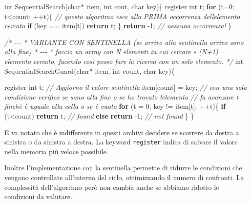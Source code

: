 \documentclass[
]{article}
\newenvironment{Shaded}{}{}
\newcommand{\AttributeTok}[1]{\textcolor[rgb]{0.49,0.56,0.16}{#1}}
\newcommand{\CommentTok}[1]{\textcolor[rgb]{0.38,0.63,0.69}{\textit{#1}}}
\newcommand{\ControlFlowTok}[1]{\textcolor[rgb]{0.00,0.44,0.13}{\textbf{#1}}}
\newcommand{\DataTypeTok}[1]{\textcolor[rgb]{0.56,0.13,0.00}{#1}}
\newcommand{\DecValTok}[1]{\textcolor[rgb]{0.25,0.63,0.44}{#1}}
\newcommand{\NormalTok}[1]{#1}
\begin{document}
\begin{Shaded}
\begin{Highlighting}[]
\DataTypeTok{int}\NormalTok{ SequentialSearch(}\DataTypeTok{char}\NormalTok{* item, }\DataTypeTok{int}\NormalTok{ cout, }\DataTypeTok{char}\NormalTok{ key)\{}
    \AttributeTok{register} \DataTypeTok{int}\NormalTok{ t;}
    \ControlFlowTok{for}\NormalTok{ (t=}\DecValTok{0}\NormalTok{; t\textless{}count; ++t)\{}
        \CommentTok{// questo algoritmo esce alla PRIMA occorrenza dell\textquotesingle{}elemento cercato}
        \ControlFlowTok{if}\NormalTok{ (key == item[t]) }\ControlFlowTok{return}\NormalTok{ t;}
\NormalTok{    \}}
    \ControlFlowTok{return}\NormalTok{ {-}}\DecValTok{1}\NormalTok{; }\CommentTok{// nessuna occorrenza!}
\NormalTok{\}}

\CommentTok{/*       {-}{-}{-} }
\CommentTok{ * VARIANTE CON SENTINELLA (se arrivo alla sentinella arrivo sono alla fine)}
\CommentTok{ *       {-}{-}{-} }
\CommentTok{ * faccio un array con N elementi in cui cercare e (N+1) = elemento cercato, facendo così posso fare la ricerca con un solo elemento.}
\CommentTok{ */}
\DataTypeTok{int}\NormalTok{ SequentialSearchGuard(}\DataTypeTok{char}\NormalTok{* item, }\DataTypeTok{int}\NormalTok{ count, }\DataTypeTok{char}\NormalTok{ key)\{}
    
    \AttributeTok{register} \DataTypeTok{int}\NormalTok{ t;}
    \CommentTok{// Aggiorno il valore sentinella}
\NormalTok{    item[count] = key;}
    \CommentTok{// con una sola condizione verifico se sono alla fine o se ho trovato l\textquotesingle{}elemento}
    \CommentTok{// fa avanzare t finchè è uguale alla cella o se è vuoto}
    \ControlFlowTok{for}\NormalTok{ (t = }\DecValTok{0}\NormalTok{; key != item[t]; ++t)\{}
    	\ControlFlowTok{if}\NormalTok{ (t\textless{}count) }\ControlFlowTok{return}\NormalTok{ t; }\CommentTok{// found}
    		\ControlFlowTok{else} \ControlFlowTok{return}\NormalTok{ {-}}\DecValTok{1}\NormalTok{;	  }\CommentTok{// not found}
\NormalTok{	\}}
\NormalTok{\}}
\end{Highlighting}
\end{Shaded}

E va notato che è indifferente in questi archivi decidere se scorrere da
destra a sinistra o da sinistra a destra. La keyword \texttt{register}
indica di salvare il valore nella memoria più veloce possibile.

Inoltre l'implementazione con la sentinella permette di ridurre le
condizioni che vengono controllate all'interno del ciclo, ottimizzando
il numero di confronti. La complessità dell'algoritmo però non cambia
anche se abbiamo ridotto le condizioni da valutare.
\end{document}

